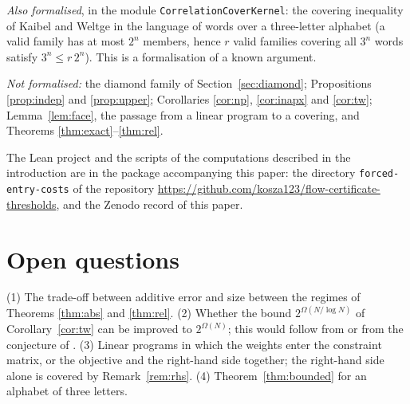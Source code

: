 \documentclass[11pt]{amsart}
\theoremstyle{plain}
\theoremstyle{definition}
\theoremstyle{remark}
\newcommand{\code}[1]{\texttt{#1}}
\begin{document}
\emph{Also formalised}, in the module \code{CorrelationCoverKernel}: the covering inequality of Kaibel and Weltge
\cite{KW} in the language of words over a three-letter alphabet (a valid family has at most $2^n$ members, hence
$r$ valid families covering all $3^n$ words satisfy $3^n\le r\,2^n$). This is a formalisation of a known argument.

\emph{Not formalised:} the diamond family of Section~\ref{sec:diamond}; Propositions \ref{prop:indep} and
\ref{prop:upper}; Corollaries \ref{cor:np}, \ref{cor:inapx} and \ref{cor:tw}; Lemma~\ref{lem:face}, the passage
from a linear program to a covering, and Theorems \ref{thm:exact}--\ref{thm:rel}.

\begin{sloppypar}
The Lean project and the scripts of the computations described in the introduction are in the package
accompanying this paper: the directory \code{forced-entry-costs} of the repository
\url{https://github.com/kosza123/flow-certificate-thresholds}, and the Zenodo record of this paper.
\end{sloppypar}

\section{Open questions}
\textup{(1)} The trade-off between additive error and size between the regimes of Theorems \ref{thm:abs} and
\ref{thm:rel}. \textup{(2)}
Whether the bound $2^{\Omega(N/\log N)}$ of Corollary~\ref{cor:tw} can be improved to $2^{\Omega(N)}$; this would
follow from \cite[Conjecture~2]{AFHMS} or from the conjecture of \cite{GJW}. \textup{(3)} Linear
programs in which the weights enter the constraint matrix, or the objective and the right-hand side together; the
right-hand side alone is covered by Remark~\ref{rem:rhs}. \textup{(4)} Theorem~\ref{thm:bounded} for an alphabet of
three letters.
\end{document}
